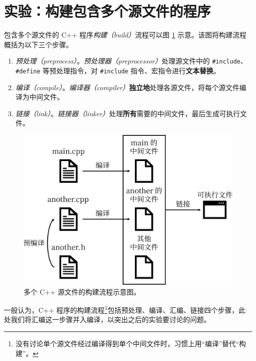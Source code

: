 
\section{实验：构建包含多个源文件的程序}

包含多个源文件的 C++ 程序\emph{构建（build）}流程可以图 \ref{fig:build-flow} 示意。该图将构建流程概括为以下三个步骤。

\begin{enumerate}
	\item \emph{预处理（preprocess）}。\emph{预处理器（preprocessor）}处理源文件中的 \lstinline[language={[17]C++}]{#include}、\lstinline[language={[17]C++}]{#define} 等预处理指令，对 \lstinline[language={[17]C++}]{#include} 指令、宏指令进行\textbf{文本替换}。
	\item \emph{编译（compile）}。\emph{编译器（compiler）}\textbf{独立地}处理各源文件，将每个源文件编译为中间文件。
	\item \emph{链接（link）}。\emph{链接器（linker）}处理\textbf{所有}需要的中间文件，最后生成可执行文件。
\end{enumerate}

\begin{figure}
	\centering
	\includegraphics[scale=0.15]{assets/build-flow}
	\caption{多个 C++ 源文件的构建流程示意图。}
	\label{fig:build-flow}
\end{figure}

一般认为，C++ 程序的构建流程\footnote{没有讨论单个源文件经过编译得到单个中间文件时，习惯上用“编译”替代“构建”。}包括预处理、编译、汇编、链接四个步骤，此处我们将汇编这一步骤并入编译，以突出之后的实验要讨论的问题。

